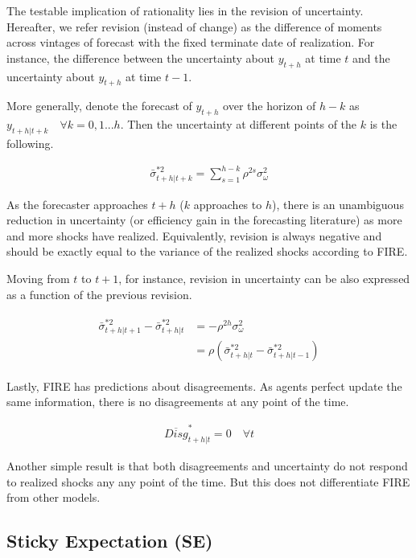 \documentclass[]{article}
\begin{document}
	The testable implication of rationality lies in the revision of uncertainty. Hereafter, we refer revision (instead of change) as the difference of moments across vintages of forecast with the fixed terminate date of realization. For instance, the difference between the uncertainty about $y_{t+h}$ at time $t$ and the uncertainty about $y_{t+h}$ at time $t-1$.
	
	More generally,  denote the forecast of $y_{t+h}$ over the horizon of $h-k$ as $y_{t+h|t+k} \quad \forall k =0,1...h$. Then the uncertainty at different points of the $k$ is the following. 
	
	\begin{eqnarray}\label{VarREPop}
		\bar \sigma^{*2}_{t+h|t+k} = \sum^{h-k}_{s=1}\rho^{2s} \sigma^2_{\omega}
	\end{eqnarray}
	
	As the forecaster approaches $t+h$ ($k$ approaches to $h$), there is an unambiguous reduction in uncertainty (or efficiency gain in the forecasting literature) as more and more shocks have realized. Equivalently, revision is always negative and should be exactly equal to the variance of the realized shocks according to FIRE. 
	
	Moving from $t$ to $t+1$, for instance, revision in uncertainty can be also expressed as a function of the previous revision.  
	
	\begin{eqnarray}\label{VarREPopRv}
		\begin{aligned}
			\bar \sigma^{*2}_{t+h|t+1} - \bar \sigma^{*2}_{t+h|t} & = - \rho^{2h}\sigma^2_\omega \\
			& =  \rho (\bar \sigma^{*2}_{t+h|t} - \bar \sigma^{*2}_{t+h|t-1})
		\end{aligned}
	\end{eqnarray}
	
	Lastly, FIRE has predictions about disagreements. As agents perfect update the same information, there is no disagreements at any point of the time. 
	
	\begin{eqnarray}\label{DisgREPop}
		\overline{Disg}^{*}_{t+h|t}=0 \quad \forall t
	\end{eqnarray}
	
	Another simple result is that both disagreements and uncertainty do not respond to realized shocks any any point of the time. But this does not differentiate FIRE from other models. 
	
	\subsection{Sticky Expectation (SE)}
	
\end{document}
